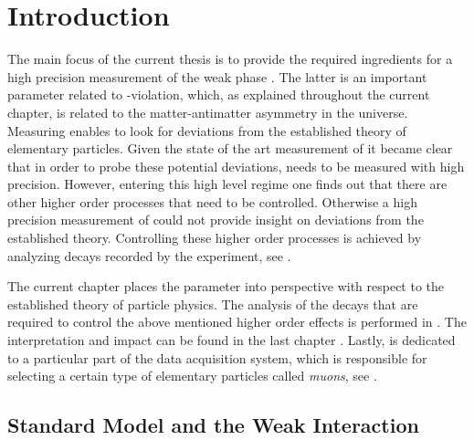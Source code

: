 
\chapter{Introduction}
\label{Introduction}

The main focus of the current thesis is to provide the required ingredients for a high precision measurement of
the weak phase \phis. The latter is an important parameter related to \CP-violation, which, as explained throughout
the current chapter, is related to the matter-antimatter asymmetry in the universe. Measuring \phis enables to look
for deviations from the established theory of elementary particles. Given the state of the art measurement of \phis
it became clear that in order to probe these potential deviations, \phis needs to be measured with high precision.
However, entering this high level regime one finds out that there are other higher order processes that need to be
controlled. Otherwise a high precision measurement of \phis could not provide insight on deviations from the
established theory. Controlling these higher order processes is achieved by analyzing \BsJpsiKst decays recorded
by the \lhcb experiment, see .

The current chapter places the \phis parameter into perspective with respect to the established theory of particle
physics. The analysis of the \BsJpsiKst decays that are required to control the above mentioned higher order effects
is performed in . The interpretation and impact can be found in the last chapter .
Lastly,  is dedicated to a particular part of the \lhcb data acquisition system, which is responsible for
selecting a certain type of elementary particles called {\it muons}, see .


\section{Standard Model and the Weak Interaction}
\label{The_Standard_Model}


